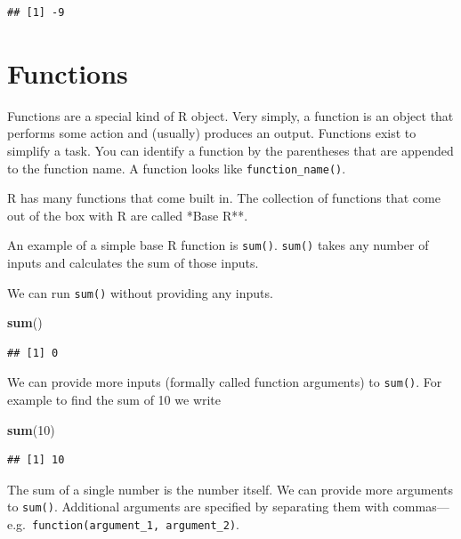 \documentclass[
]{book}
\newenvironment{Shaded}{\begin{snugshade}}{\end{snugshade}}
\newcommand{\DecValTok}[1]{\textcolor[rgb]{0.00,0.00,0.81}{#1}}
\newcommand{\KeywordTok}[1]{\textcolor[rgb]{0.13,0.29,0.53}{\textbf{#1}}}
\newcommand{\NormalTok}[1]{#1}
\begin{document}
\begin{verbatim}
## [1] -9
\end{verbatim}

\hypertarget{functions}{%
\section{Functions}\label{functions}}

Functions are a special kind of R object. Very simply, a function is an object that performs some action and (usually) produces an output. Functions exist to simplify a task. You can identify a function by the parentheses that are appended to the function name. A function looks like \texttt{function\_name()}.

R has many functions that come built in. The collection of functions that come out of the box with R are called *Base R**.

An example of a simple base R function is \texttt{sum()}. \texttt{sum()} takes any number of inputs and calculates the sum of those inputs.

We can run \texttt{sum()} without providing any inputs.

\begin{Shaded}
\begin{Highlighting}[]
\KeywordTok{sum}\NormalTok{()}
\end{Highlighting}
\end{Shaded}

\begin{verbatim}
## [1] 0
\end{verbatim}

We can provide more inputs (formally called function arguments) to \texttt{sum()}. For example to find the sum of 10 we write

\begin{Shaded}
\begin{Highlighting}[]
\KeywordTok{sum}\NormalTok{(}\DecValTok{10}\NormalTok{)}
\end{Highlighting}
\end{Shaded}

\begin{verbatim}
## [1] 10
\end{verbatim}

The sum of a single number is the number itself. We can provide more arguments to \texttt{sum()}. Additional arguments are specified by separating them with commas---e.g.~\texttt{function(argument\_1,\ argument\_2)}.
\end{document}
